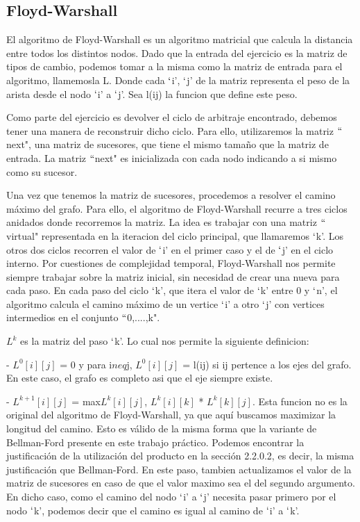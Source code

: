 \subsection{Floyd-Warshall}
 \label{res-floyd}
El algoritmo de Floyd-Warshall es un algoritmo matricial que calcula la distancia entre todos los distintos nodos. Dado que la entrada del ejercicio es la matriz de tipos de cambio, podemos tomar a la misma como la matriz de entrada para el algoritmo, llamemosla L. Donde cada $`$i', $`$j' de la matriz representa el peso de la arista desde el nodo $`$i' a $`$j'. Sea l(ij) la funcion que define este peso.

Como parte del ejercicio es devolver el ciclo de arbitraje encontrado, debemos tener una manera de reconstruir dicho ciclo. Para ello, utilizaremos la matriz $``$next", una matriz de sucesores, que tiene el mismo tamaño que la matriz de entrada. La matriz $``$next" es inicializada con cada nodo indicando a si mismo como su sucesor.

Una vez que tenemos la matriz de sucesores, procedemos a resolver el camino máximo del grafo. Para ello, el algoritmo de Floyd-Warshall recurre a tres ciclos anidados donde recorremos la matriz. La idea es trabajar con una matriz $``$virtual" representada en la iteracion del ciclo principal, que llamaremos $`$k'. Los otros dos ciclos recorren el valor de $`$i' en el primer caso y el de $`$j' en el ciclo interno. Por cuestiones de complejidad temporal, Floyd-Warshall nos permite siempre trabajar sobre la matriz inicial, sin necesidad de crear una nueva para cada paso. En cada paso del ciclo $`$k', que itera el valor de $`$k' entre 0 y $`$n', el algoritmo calcula el camino máximo de un vertice $`$i' a otro $`$j' con vertices intermedios en el conjunto $``${0,....,k}".

$L^{k}$ es la matriz del paso $`$k'. Lo cual nos permite la siguiente definicion:

- $L^{0}[i][j]$ = 0 y para i$neq$j, $L^{0}[i][j]$ = l(ij) si ij pertence a los ejes del grafo. En este caso, el grafo es completo asi que el eje siempre existe.

- $L^{k+1}[i][j]$ = max{$L^{k}[i][j]$, $L^{k}[i][k]$ * $L^{k}[k][j]$}. Esta funcion no es la original del algoritmo de Floyd-Warshall, ya que aquí buscamos maximizar la longitud del camino. Esto es válido de la misma forma que la variante de Bellman-Ford presente en este trabajo práctico. Podemos encontrar la justificación de la utilización del producto en la sección 2.2.0.2, es decir, la misma justificación que Bellman-Ford. En este paso, tambien actualizamos el valor de la matriz de sucesores en caso de que el valor maximo sea el del segundo argumento. En dicho caso, como el camino del nodo $`$i' a $`$j' necesita pasar primero por el nodo $`$k', podemos decir que el camino es igual al camino de $`$i' a $`$k'.

